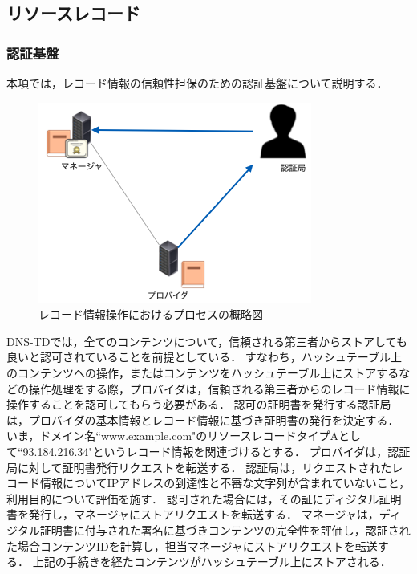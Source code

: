 \newpage
\subsection{リソースレコード}
\subsubsection{認証基盤}
\label{sec:certificate}
本項では，レコード情報の信頼性担保のための認証基盤について説明する．
\begin{figure}[h]
 \centering
 \includegraphics[scale=0.7]{figure/certificate-procedure.png}
 \caption{レコード情報操作におけるプロセスの概略図}
 \label{fig:manager-provider}
\end{figure}

DNS-TDでは，全てのコンテンツについて，信頼される第三者からストアしても良いと認可されていることを前提としている．
すなわち，ハッシュテーブル上のコンテンツへの操作，またはコンテンツをハッシュテーブル上にストアするなどの操作処理をする際，プロバイダは，信頼される第三者からのレコード情報に操作することを認可してもらう必要がある．
認可の証明書を発行する認証局は，プロバイダの基本情報とレコード情報に基づき証明書の発行を決定する．
いま，ドメイン名``www.example.com"のリソースレコードタイプAとして``93.184.216.34"というレコード情報を関連づけるとする．
プロバイダは，認証局に対して証明書発行リクエストを転送する．
認証局は，リクエストされたレコード情報についてIPアドレスの到達性と不審な文字列が含まれていないこと，利用目的について評価を施す．
認可された場合には，その証にディジタル証明書を発行し，マネージャにストアリクエストを転送する．
マネージャは，ディジタル証明書に付与された署名に基づきコンテンツの完全性を評価し，認証された場合コンテンツIDを計算し，担当マネージャにストアリクエストを転送する．
上記の手続きを経たコンテンツがハッシュテーブル上にストアされる．


